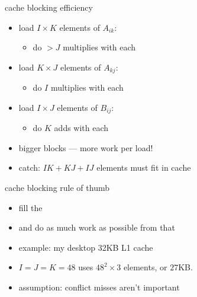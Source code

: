 \begin{frame}{cache blocking efficiency}
\begin{itemize}
\item load $I\times K$ elements of $A_{ik}$: 
    \begin{itemize}
        \item do $>J$ multiplies with each
    \end{itemize}
\item load $K\times J$ elements of $A_{kj}$: 
    \begin{itemize}
        \item do $I$ multiplies with each
    \end{itemize}
\item load $I\times J$ elements of $B_{ij}$:
    \begin{itemize}
        \item do $K$ adds with each
    \end{itemize}
\item bigger blocks --- more work per load!
\item catch: $IK+KJ+IJ$ elements must fit in cache
\end{itemize}
\end{frame}

\begin{frame}{cache blocking rule of thumb}
\begin{itemize}
\item fill the 
\item and do as much work as possible from that
\item example: my desktop 32KB L1 cache
\item $I=J=K=48$ uses $48^2\times 3$ elements, or $27$KB.
\item assumption: conflict misses aren't important
\end{itemize}
\end{frame}


